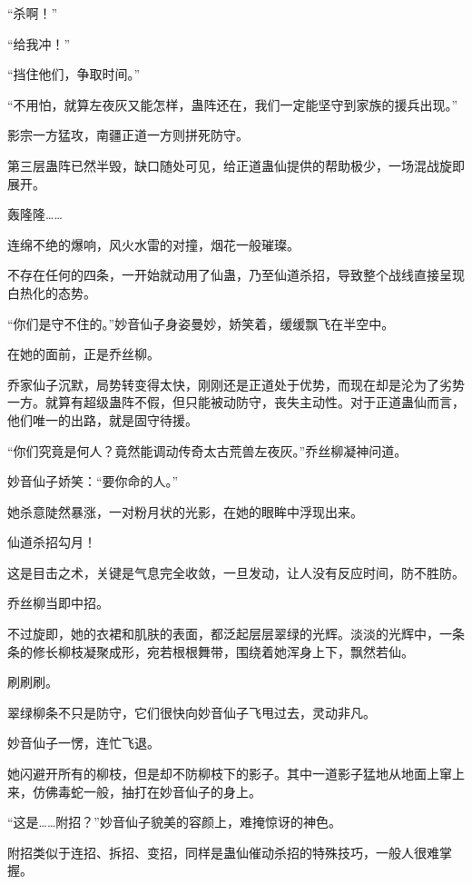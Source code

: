 
\begin{this_body}



“杀啊！”

“给我冲！”

“挡住他们，争取时间。”

“不用怕，就算左夜灰又能怎样，蛊阵还在，我们一定能坚守到家族的援兵出现。”

影宗一方猛攻，南疆正道一方则拼死防守。

第三层蛊阵已然半毁，缺口随处可见，给正道蛊仙提供的帮助极少，一场混战旋即展开。

轰隆隆……

连绵不绝的爆响，风火水雷的对撞，烟花一般璀璨。

不存在任何的四条，一开始就动用了仙蛊，乃至仙道杀招，导致整个战线直接呈现白热化的态势。

“你们是守不住的。”妙音仙子身姿曼妙，娇笑着，缓缓飘飞在半空中。

在她的面前，正是乔丝柳。

乔家仙子沉默，局势转变得太快，刚刚还是正道处于优势，而现在却是沦为了劣势一方。就算有超级蛊阵不假，但只能被动防守，丧失主动性。对于正道蛊仙而言，他们唯一的出路，就是固守待援。

“你们究竟是何人？竟然能调动传奇太古荒兽左夜灰。”乔丝柳凝神问道。

妙音仙子娇笑：“要你命的人。”

她杀意陡然暴涨，一对粉月状的光影，在她的眼眸中浮现出来。

仙道杀招勾月！

这是目击之术，关键是气息完全收敛，一旦发动，让人没有反应时间，防不胜防。

乔丝柳当即中招。

不过旋即，她的衣裙和肌肤的表面，都泛起层层翠绿的光辉。淡淡的光辉中，一条条的修长柳枝凝聚成形，宛若根根舞带，围绕着她浑身上下，飘然若仙。

刷刷刷。

翠绿柳条不只是防守，它们很快向妙音仙子飞甩过去，灵动非凡。

妙音仙子一愣，连忙飞退。

她闪避开所有的柳枝，但是却不防柳枝下的影子。其中一道影子猛地从地面上窜上来，仿佛毒蛇一般，抽打在妙音仙子的身上。

“这是……附招？”妙音仙子貌美的容颜上，难掩惊讶的神色。

附招类似于连招、拆招、变招，同样是蛊仙催动杀招的特殊技巧，一般人很难掌握。


\end{this_body}
